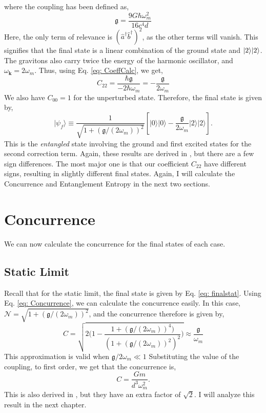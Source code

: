 \documentclass[12pt,a4paper]{report}
\theoremstyle{plain}
\theoremstyle{definition}
\theoremstyle{remark}
\renewcommand{\dag}{\dagger}
\newcommand{\ahat}{\hat{a}}
\newcommand{\bhat}{\hat{b}}
\newcommand{\g}{\mathfrak{g}}
\DeclarePairedDelimiter\ket{\lvert}{\rangle}
\begin{document}
where the coupling has been  defined as,
\begin{equation} \label{eq: CouplingNS2}
    \g = \frac{9G\hbar\omega_m^2}{16c^4d}
\end{equation}
Here, the only term of relevance is $(\ahat^{\dag}\bhat^{\dag})^2$, as the other terms will vanish. This signifies that the final state is a linear combination of the ground state and $\ket{2}\ket{2}$. The gravitons also carry twice the energy of the harmonic oscillator, and $\omega_{\bm{k}} = 2\omega_m$. Thus, using Eq. \ref{eq: CoeffCalc}, we get,
\begin{equation}
    C_{22} = \frac{\hbar\g}{-2\hbar\omega_m} = -\frac{\g}{2\omega_m}
\end{equation}
We also have $C_{00} = 1$ for the unperturbed state. Therefore, the final state is given by,
\begin{equation}\label{eq: finalns2}
    \vert\psi_{f}\rangle\equiv\frac{1}{\sqrt{1+(\mathfrak{g}/(2\omega_{m}))^{2}}}[\vert0\rangle\vert0\rangle-\frac{\mathfrak{g}}{2\omega_{m}}\vert2\rangle\vert2\rangle].
\end{equation}
This is the \textit{entangled} state involving the ground and first excited states for the second correction term. Again, these results are derived in \citet{Bose_2022}, but there are a few sign differences. The most major one is that our coefficient $C_{22}$ have different signs, resulting in slightly different final states. Again, I will calculate the Concurrence and Entanglement Entropy in the next two sections.
\section{Concurrence} \label{sec: Conc}
We can now calculate the concurrence for the final states of each case.
\subsection{Static Limit}
Recall that for the static limit, the final state is given by Eq. \ref{eq: finalstat}.
Using Eq. \ref{eq: Concurrence}, we can calculate the concurrence easily.
In this case, $\mathcal{N} = \sqrt{1+(\mathfrak{g}/(2\omega_{m}))^{2}}$, and the concurrence therefore is given by,
\begin{equation}
    C = \sqrt{2\Bigg(1- \frac{1+(\mathfrak{g}/(2\omega_{m}))^{4})}{(1+(\mathfrak{g}/(2\omega_{m}))^{2})^2}\Bigg)} \approx \frac{\mathfrak{g}}{\omega_{m}}
\end{equation}
This approximation is valid when $\mathfrak{g}/2\omega_{m} \ll 1$ Substituting the value of the coupling, to first order, we get that the concurrence is,
\begin{equation}
    C = \frac{Gm}{d^3\omega_m^2}.
\end{equation}
This is also derived in \citet{Bose_2022}, but they have an extra factor of $\sqrt{2}$. I will analyze this result in the next chapter.
\end{document}

